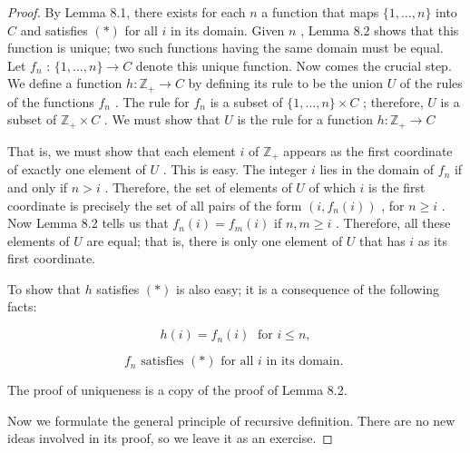 \begin{proof}By Lemma 8.1, there exists for each \(n\) a function that maps \(\{ 1,\ldots ,n\}\) into \(C\) and satisfies \(\left( *\right)\) for all \(i\) in its domain. Given \(n\) , Lemma 8.2 shows that this function is unique; two such functions having the same domain must be equal. Let \({f}_{n}\) : \(\{ 1,\ldots ,n\}  \rightarrow  C\) denote this unique function.
Now comes the crucial step. We define a function \(h : {\mathbb{Z}}_{ + } \rightarrow  C\) by defining its rule to be the union \(U\) of the rules of the functions \({f}_{n}\) . The rule for \({f}_{n}\) is a subset of \(\{ 1,\ldots ,n\}  \times  C\) ; therefore, \(U\) is a subset of \({\mathbb{Z}}_{ + } \times  C\) . We must show that \(U\) is the rule for a function \(h : {\mathbb{Z}}_{ + } \rightarrow  C\)

That is, we must show that each element \(i\) of \({\mathbb{Z}}_{ + }\) appears as the first coordinate of exactly one element of \(U\) . This is easy. The integer \(i\) lies in the domain of \({f}_{n}\) if and only if \(n > i\) . Therefore, the set of elements of \(U\) of which \(i\) is the first coordinate is precisely the set of all pairs of the form \(\left( {i,{f}_{n}\left( i\right) }\right)\) , for \(n \geq  i\) . Now Lemma 8.2 tells us that \({f}_{n}\left( i\right)  = {f}_{m}\left( i\right)\) if \(n,m \geq  i\) . Therefore, all these elements of \(U\) are equal; that is, there is only one element of \(U\) that has \(i\) as its first coordinate.

To show that \(h\) satisfies \(\left( *\right)\) is also easy; it is a consequence of the following facts:

\[
h\left( i\right)  = {f}_{n}\left( i\right) \;\text{ for }i \leq  n,
\]

\[
{f}_{n}\text{ satisfies }\left( *\right) \text{ for all }i\text{ in its domain. }
\]

The proof of uniqueness is a copy of the proof of Lemma 8.2.

Now we formulate the general principle of recursive definition. There are no new ideas involved in its proof, so we leave it as an exercise.
\end{proof}
